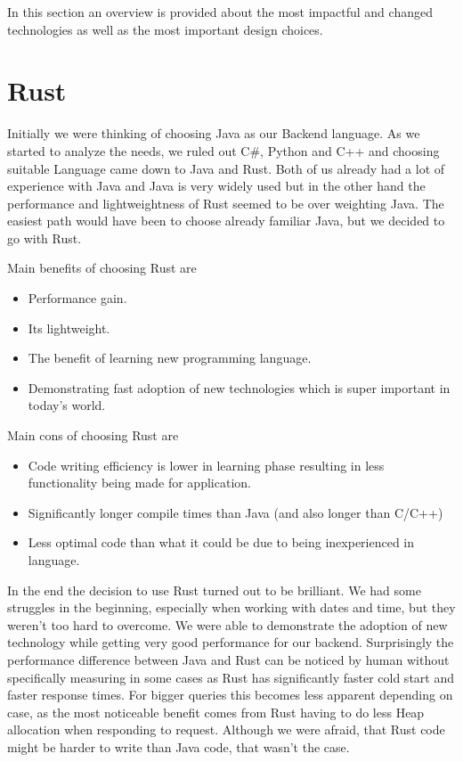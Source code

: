 In this section an overview is provided about the most impactful and changed technologies as well as the most important design choices.

\section{Rust}\label{sec:rust}
Initially we were thinking of choosing Java as our Backend language.
As we started to analyze the needs, we ruled out C\#, Python and C++ and choosing suitable Language came down to Java and Rust.
Both of us already had a lot of experience with Java and Java is very widely used but in the other hand the performance and lightweightness of Rust seemed to be over weighting Java.
The easiest path would have been to choose already familiar Java, but we decided to go with Rust.

Main benefits of choosing Rust are
\begin{itemize}
    \item Performance gain.
    \item Its lightweight.
    \item The benefit of learning new programming language.
    \item Demonstrating fast adoption of new technologies which is super important in today's world.
\end{itemize}

Main cons of choosing Rust are
\begin{itemize}
    \item Code writing efficiency is lower in learning phase resulting in less functionality being made for application.
    \item Significantly longer compile times than Java (and also longer than C/C++)
    \item Less optimal code than what it could be due to being inexperienced in language.
\end{itemize}

In the end the decision to use Rust turned out to be brilliant.
We had some struggles in the beginning, especially when working with dates and time, but they weren't too hard to overcome.
We were able to demonstrate the adoption of new technology while getting very good performance for our backend.
Surprisingly the performance difference between Java and Rust can be noticed by human without specifically measuring in some cases
as Rust has significantly faster cold start and faster response times.
For bigger queries this becomes less apparent depending on case, as the most noticeable benefit comes from Rust
having to do less Heap allocation when responding to request.
Although we were afraid, that Rust code might be harder to write than Java code, that wasn't the case.

